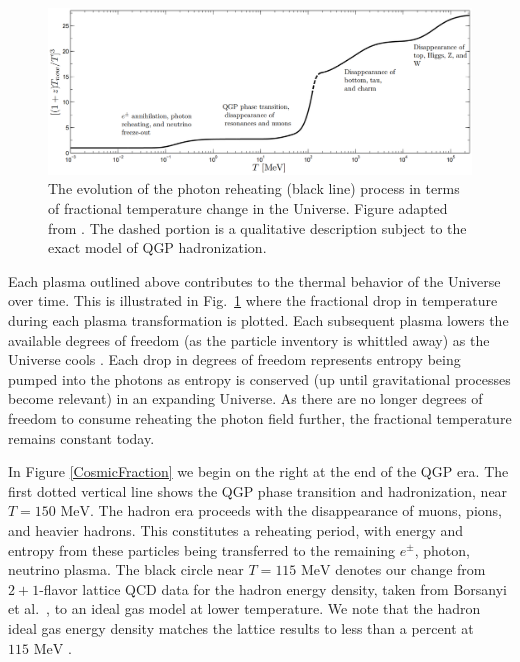 \documentclass[universe,article,submit,moreauthors,pdftex,a4paper]{Definitions/mdpi}
\newcommand{\MeV}{\text{ MeV}}
\newcommand*{\rf}[1]{Fig.~{\ref{#1}}}
\begin{document}
\begin{figure}[h]
  \centering
  \includegraphics[width=\textwidth]{./plots/degrees_of_freedom}
  \caption{The evolution of the photon reheating (black line) process in terms of fractional temperature change in the Universe. Figure adapted from \cite{Rafelski:2013yka}. The dashed portion is a qualitative description subject to the exact model of QGP hadronization.}
  \label{degrees_of_freedom} 
\end{figure}

Each plasma outlined above contributes to the thermal behavior of the Universe over time. This is illustrated in \rf{degrees_of_freedom} where the fractional drop in temperature during each plasma transformation is plotted. Each subsequent plasma lowers the available degrees of freedom (as the particle inventory is whittled away) as the Universe cools \cite{Rafelski:2013yka}. Each drop in degrees of freedom represents entropy being pumped into the photons as entropy is conserved (up until gravitational processes become relevant) in an expanding Universe. As there are no longer degrees of freedom to consume reheating the photon field further, the fractional temperature remains constant today.

In Figure \ref{CosmicFraction} we begin on the right at the end  of the QGP era.  The first dotted vertical line shows the QGP phase transition and hadronization, near $T=150\MeV$. The hadron era proceeds with the disappearance of muons, pions, and heavier hadrons. This constitutes a reheating period, with energy and entropy from these particles being transferred to the remaining $e^\pm$, photon, neutrino plasma. The black circle near $T=115\MeV$ denotes our change from $2+1$-flavor lattice QCD \cite{Kronfeld:2012ym, DElia:2012ifm, Bonati:2013hsa} data for the hadron energy density, taken from Borsanyi et al.~\cite{Borsanyi:2013bia}, to an ideal gas model \cite{Bernstein:1988bw} at lower temperature.  We note that the hadron ideal gas energy density matches the lattice results to less than a percent at $115\MeV$ \cite{Philipsen:2012nu}. 
\end{document}
